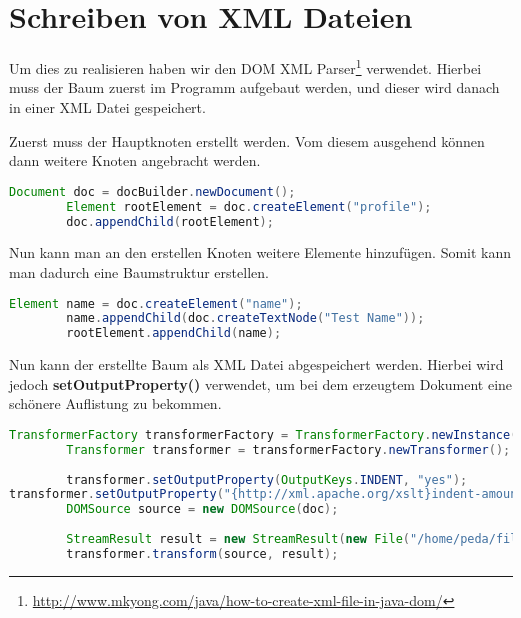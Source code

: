 \section{Schreiben von XML Dateien}
\label{sec:xml-write}

Um dies zu realisieren haben wir den DOM XML Parser\footnote{\url{http://www.mkyong.com/java/how-to-create-xml-file-in-java-dom/}} verwendet. Hierbei muss der Baum zuerst im Programm aufgebaut werden, und dieser wird danach in einer XML Datei gespeichert.

Zuerst muss der Hauptknoten erstellt werden. Vom diesem ausgehend können dann weitere Knoten angebracht werden.
\begin{lstlisting}[language=JAVA]
		Document doc = docBuilder.newDocument();
		Element rootElement = doc.createElement("profile");
		doc.appendChild(rootElement);
\end{lstlisting}

Nun kann man an den erstellen Knoten weitere Elemente hinzufügen. Somit kann man dadurch eine Baumstruktur erstellen.
\begin{lstlisting}[language=JAVA]
Element name = doc.createElement("name");
		name.appendChild(doc.createTextNode("Test Name"));
		rootElement.appendChild(name);
\end{lstlisting}

Nun kann der erstellte Baum als XML Datei abgespeichert werden. Hierbei wird jedoch \textbf{setOutputProperty()} verwendet, um bei dem erzeugtem Dokument eine schönere Auflistung zu bekommen.
\begin{lstlisting}[language=JAVA]
TransformerFactory transformerFactory = TransformerFactory.newInstance();
		Transformer transformer = transformerFactory.newTransformer();
		
		transformer.setOutputProperty(OutputKeys.INDENT, "yes");
transformer.setOutputProperty("{http://xml.apache.org/xslt}indent-amount", "2");
		DOMSource source = new DOMSource(doc);
		
		StreamResult result = new StreamResult(new File("/home/peda/file.xml"));
		transformer.transform(source, result);
\end{lstlisting}